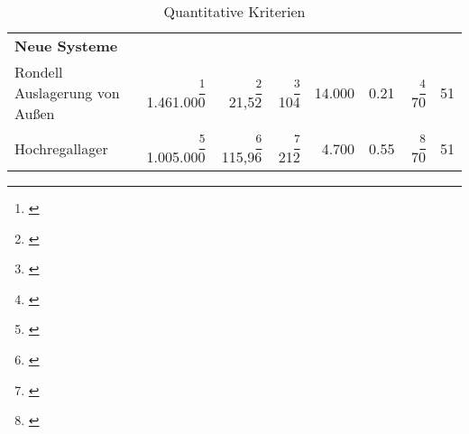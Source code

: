 \begin{landscape}
\begin{table}
\begin{tabular}{p{}rrrrrrr}
            \midrule

            \textbf{Neue Systeme}                                                                                                                                                                                                                                                                                                                                                                                       \\
            Rondell Auslagerung von Außen                      & \footnote{\cite{ltw_kosten_konstruktionen}} 1.461.000 & \footnote{\cite{ltw_kosten_konstruktionen}} 21,52     & \footnote{\cite{ltw_kosten_konstruktionen}} 104 & 14.000                                & 0.21                                       & \footnote{\cite{ltw_spielzeiten_20m_rondell}} 70 & 51                                           \\
            Hochregallager                                     & \footnote{\cite{ltw_kosten_konstruktionen}} 1.005.000 & \footnote{\cite{ltw_kosten_konstruktionen}} 115,96    & \footnote{\cite{ltw_kosten_konstruktionen}} 212 & 4.700                                 & 0.55                                       & \footnote{\cite{ltw_spielzeiten_15m}} 70         & 51                                           \\

            \bottomrule
        \end{tabular}
        \caption{Quantitative Kriterien}
        \label{tab:quantitative_kriterien}
    \end{table}
\end{landscape}

\pagestyle{plain}

\restoregeometry